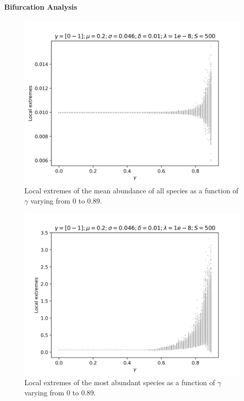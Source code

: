 \documentclass[11pt,a4paper,fleqn]{scrartcl}
\begin{document}
\clearpage


\paragraph{Bifurcation Analysis}

\begin{figure}[H]
    \centering
    \includegraphics[width=\linewidth]{Bifurcation/BifurcationMeanGamma.png}
    \caption{Local extremes of the mean abundance of all species as a function of $\gamma$ varying from 0 to 0.89.}
\end{figure}

\begin{figure}[H]
    \centering
    \includegraphics[width=\linewidth]{Bifurcation/BifurcationM1.png}
    \caption{Local extremes of the most abundant species as a function of $\gamma$ varying from 0 to 0.89.}
\end{figure}
\clearpage
\end{document}

